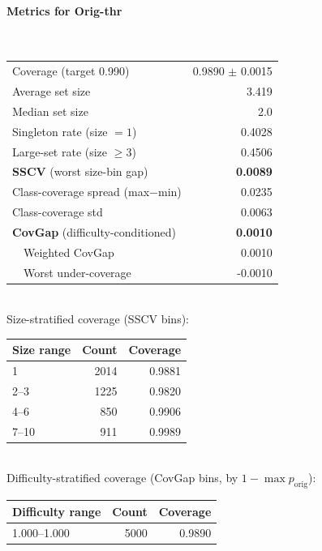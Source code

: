 \documentclass[parskip=half]{scrartcl}
\begin{document}
\paragraph{Metrics for Orig-thr}~\\
\begin{tabular}{l r}
\hline
Coverage (target 0.990) & 0.9890 $\pm$ 0.0015 \\
Average set size & 3.419 \\
Median set size & 2.0 \\
Singleton rate (size $=1$) & 0.4028 \\
Large-set rate (size $\geq 3$) & 0.4506 \\
\textbf{SSCV} (worst size-bin gap) & \textbf{0.0089} \\
Class-coverage spread (max$-$min) & 0.0235 \\
Class-coverage std & 0.0063 \\
\textbf{CovGap} (difficulty-conditioned) & \textbf{0.0010} \\
~~Weighted CovGap & 0.0010 \\
~~Worst under-coverage & -0.0010 \\
\hline
\end{tabular}\\[0.5em]
\textsf{\scriptsize Size-stratified coverage (SSCV bins):}\\
\begin{tabular}{l r r}
\hline
Size range & Count & Coverage \\
\hline
1 & 2014 & 0.9881 \\
2--3 & 1225 & 0.9820 \\
4--6 & 850 & 0.9906 \\
7--10 & 911 & 0.9989 \\
\hline
\end{tabular}\\[0.5em]
\textsf{\scriptsize Difficulty-stratified coverage (CovGap bins, by $1-\max p_{\mathrm{orig}}$):}\\
\begin{tabular}{l r r}
\hline
Difficulty range & Count & Coverage \\
\hline
1.000--1.000 & 5000 & 0.9890 \\
\hline
\end{tabular}\\[0.5em]
\end{document}
